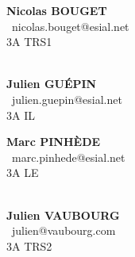 \documentclass[10pt]{article}
\begin{document}
\thispagestyle{empty}

\begin{multicols}{2}
{\large
	\begin{flushleft}
		\noindent{}\textbf{Nicolas BOUGET}\\
		\Letter~nicolas.bouget@esial.net\\
		3A TRS1\\~

		\noindent{}\textbf{Julien GUÉPIN}\\
		\Letter~julien.guepin@esial.net\\
		3A IL\\
	\end{flushleft}

	\begin{flushright}
		\noindent{}\textbf{Marc PINHÈDE}\\
		\Letter~marc.pinhede@esial.net\\
		3A LE\\~

		\noindent{}\textbf{Julien VAUBOURG}\\
		\Letter~julien@vaubourg.com\\
		3A TRS2\\
	\end{flushright}
}
\end{multicols}

\vspace{1cm}
\end{document}

